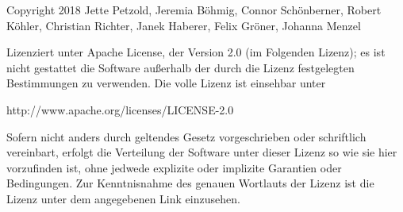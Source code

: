 \begin{tcolorbox}
Copyright 2018 Jette Petzold, Jeremia B\"{o}hmig, Connor Sch\"{o}nberner, Robert K\"{o}hler, Christian Richter, Janek Haberer, Felix Gr\"{o}ner, Johanna Menzel

Lizenziert unter Apache License, der Version 2.0 (im Folgenden Lizenz); es ist nicht gestattet die Software au\ss{}erhalb der durch die Lizenz festgelegten Bestimmungen zu verwenden.
Die volle Lizenz ist einsehbar unter

http://www.apache.org/licenses/LICENSE-2.0

Sofern nicht anders durch geltendes Gesetz vorgeschrieben oder schriftlich vereinbart, erfolgt die Verteilung der Software unter dieser Lizenz so wie sie hier vorzufinden ist, ohne jedwede explizite oder implizite Garantien oder Bedingungen.
Zur Kenntnisnahme des genauen Wortlauts der Lizenz ist die Lizenz unter dem angegebenen Link einzusehen.

\end{tcolorbox}